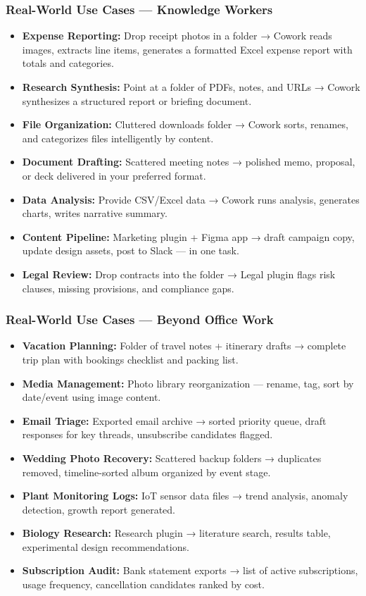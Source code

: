 \begin{frame}[fragile]\frametitle{Real-World Use Cases — Knowledge Workers}
  \begin{itemize}
    \item \textbf{Expense Reporting:} Drop receipt photos in a folder → Cowork reads images, extracts line items, generates a formatted Excel expense report with totals and categories.
    \item \textbf{Research Synthesis:} Point at a folder of PDFs, notes, and URLs → Cowork synthesizes a structured report or briefing document.
    \item \textbf{File Organization:} Cluttered downloads folder → Cowork sorts, renames, and categorizes files intelligently by content.
    \item \textbf{Document Drafting:} Scattered meeting notes → polished memo, proposal, or deck delivered in your preferred format.
    \item \textbf{Data Analysis:} Provide CSV/Excel data → Cowork runs analysis, generates charts, writes narrative summary.
    \item \textbf{Content Pipeline:} Marketing plugin + Figma app → draft campaign copy, update design assets, post to Slack — in one task.
    \item \textbf{Legal Review:} Drop contracts into the folder → Legal plugin flags risk clauses, missing provisions, and compliance gaps.
  \end{itemize}
\end{frame}

\begin{frame}[fragile]\frametitle{Real-World Use Cases — Beyond Office Work}
  \begin{itemize}
    \item \textbf{Vacation Planning:} Folder of travel notes + itinerary drafts → complete trip plan with bookings checklist and packing list.
    \item \textbf{Media Management:} Photo library reorganization — rename, tag, sort by date/event using image content.
    \item \textbf{Email Triage:} Exported email archive → sorted priority queue, draft responses for key threads, unsubscribe candidates flagged.
    \item \textbf{Wedding Photo Recovery:} Scattered backup folders → duplicates removed, timeline-sorted album organized by event stage.
    \item \textbf{Plant Monitoring Logs:} IoT sensor data files → trend analysis, anomaly detection, growth report generated.
    \item \textbf{Biology Research:} Research plugin → literature search, results table, experimental design recommendations.
    \item \textbf{Subscription Audit:} Bank statement exports → list of active subscriptions, usage frequency, cancellation candidates ranked by cost.
  \end{itemize}
\end{frame}

